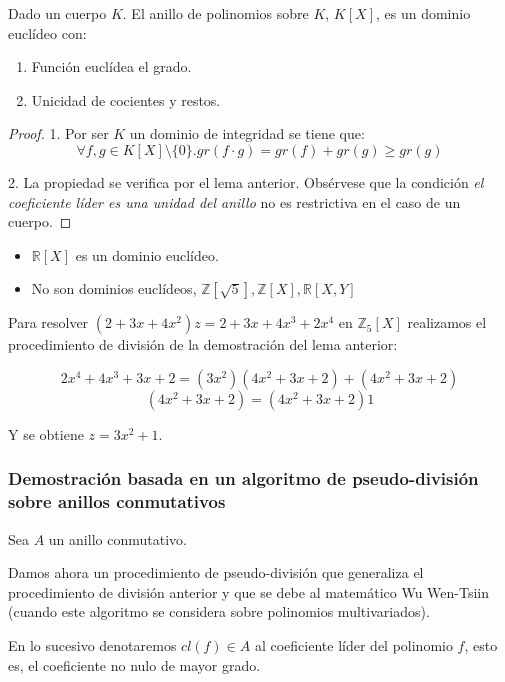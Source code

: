 \begin{theorem}
	Dado un cuerpo $K$. El anillo de polinomios sobre $K$, $K[X]$, es un dominio euclídeo con:
	
	\begin{enumerate}
	\item Función euclídea el grado.
	\item Unicidad de cocientes y restos. 
	\end{enumerate} 
\end{theorem}
\begin{proof}
	1. Por ser $K$ un dominio de integridad se tiene que: $$\forall f,g \in K[X] \setminus \{0\}.gr(f \cdot g) = gr(f) + gr(g) \ge gr(g)$$
	
	2. La propiedad se verifica por el lema anterior. Obsérvese que la condición \textit{el coeficiente líder es una unidad del anillo} no es restrictiva en el caso de un cuerpo. 
\end{proof}

\begin{example}
	\begin{itemize}
		\item $\mathbb{R}[X]$ es un dominio euclídeo. 
		\item No son dominios euclídeos, $\mathbb{Z}[\sqrt{5}],\mathbb{Z}[X],\mathbb{R}[X,Y]$
	\end{itemize}
	
	Para resolver $(2+3x+4x^2)z = 2+3x+4x^3+2x^4$ en $\mathbb{Z}_5[X]$ realizamos el procedimiento de división de la demostración del lema anterior:
	
	$$2x^4+4x^3+3x+2 = (3x^2)(4x^2+3x+2) + (4x^2+3x+2)$$
	$$(4x^2+3x+2) = (4x^2+3x+2)1$$
	
	Y se obtiene $z = 3x^2+1$. 
\end{example}

\subsubsection{Demostración basada en un algoritmo de pseudo-división sobre anillos conmutativos}

Sea $A$ un anillo conmutativo.

Damos ahora un procedimiento de pseudo-división que generaliza el procedimiento de división anterior y que se debe al matemático Wu Wen-Tsiin (cuando este algoritmo se considera sobre polinomios multivariados).

En lo sucesivo denotaremos $cl(f) \in A$ al coeficiente líder del polinomio $f$, esto es, el coeficiente no nulo de mayor grado. 

